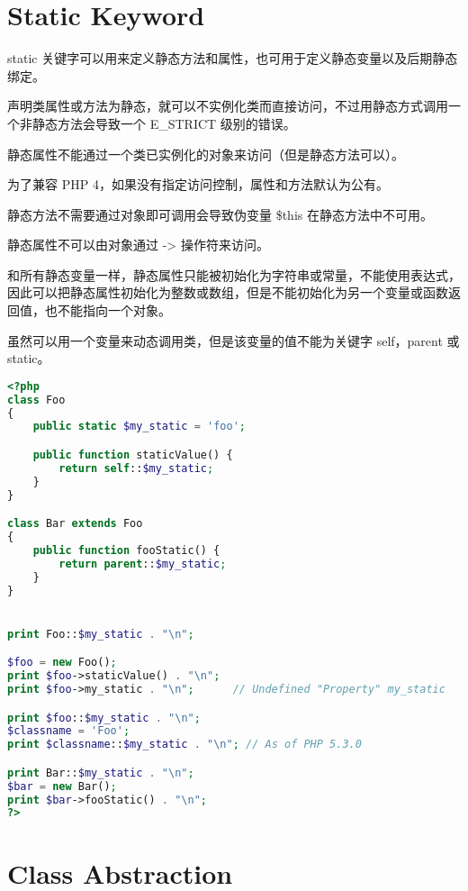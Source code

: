 \chapter{Static Keyword}

static 关键字可以用来定义静态方法和属性，也可用于定义静态变量以及后期静态绑定。

声明类属性或方法为静态，就可以不实例化类而直接访问，不过用静态方式调用一个非静态方法会导致一个 E\_STRICT 级别的错误。

静态属性不能通过一个类已实例化的对象来访问（但是静态方法可以）。

为了兼容 PHP 4，如果没有指定访问控制，属性和方法默认为公有。

\begin{compactitem}
\item 静态方法不需要通过对象即可调用会导致伪变量 \$this 在静态方法中不可用。
\item 静态属性不可以由对象通过 -\/> 操作符来访问。
\end{compactitem}




和所有静态变量一样，静态属性只能被初始化为字符串或常量，不能使用表达式，因此可以把静态属性初始化为整数或数组，但是不能初始化为另一个变量或函数返回值，也不能指向一个对象。

虽然可以用一个变量来动态调用类，但是该变量的值不能为关键字 self，parent 或 static。


\begin{lstlisting}[language=PHP]
<?php
class Foo
{
    public static $my_static = 'foo';

    public function staticValue() {
        return self::$my_static;
    }
}

class Bar extends Foo
{
    public function fooStatic() {
        return parent::$my_static;
    }
}


print Foo::$my_static . "\n";

$foo = new Foo();
print $foo->staticValue() . "\n";
print $foo->my_static . "\n";      // Undefined "Property" my_static 

print $foo::$my_static . "\n";
$classname = 'Foo';
print $classname::$my_static . "\n"; // As of PHP 5.3.0

print Bar::$my_static . "\n";
$bar = new Bar();
print $bar->fooStatic() . "\n";
?>
\end{lstlisting}


\chapter{Class Abstraction}

